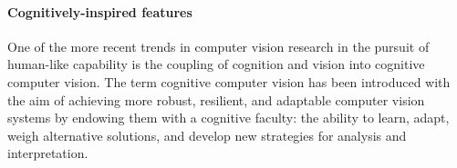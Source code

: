 
\paragraph{Cognitively-inspired features \label{proposed-cognitive}}
One of the more recent trends in computer vision research in the pursuit of human-like capability is the coupling of cognition and vision into cognitive computer vision. The term cognitive computer vision has been introduced with the aim of achieving more robust, resilient, and adaptable computer vision systems by endowing them with a cognitive faculty: the ability to learn, adapt, weigh alternative solutions, and develop new strategies for analysis and interpretation.


